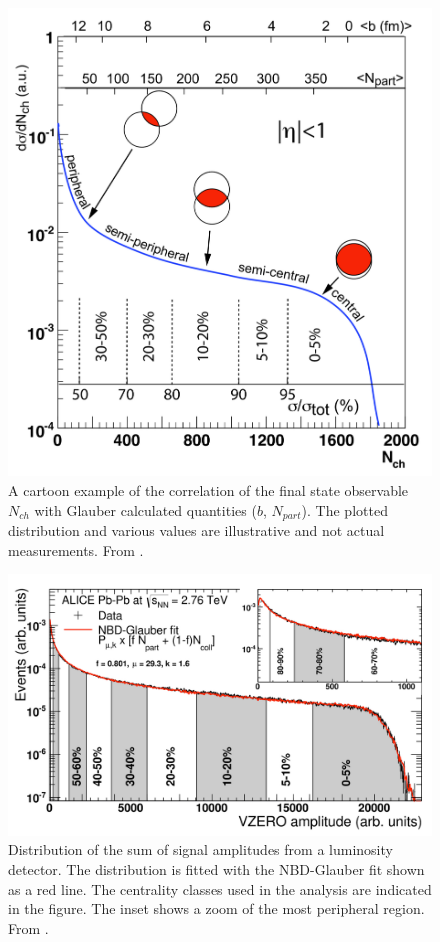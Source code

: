 \begin{figure}[!t]
\begin{center}
\includegraphics[width=0.75\linewidth]{Chapters/Analysis/Figs/glauber-centrality.pdf}
\caption{A cartoon example of the correlation of the final state observable $N_{ch}$ with Glauber calculated quantities ($b$, $N_{part}$). The plotted distribution and various values are illustrative and not actual measurements. From \cite{Miller:2007ri}.}
\label{fig:GlauberCent}
\end{center}
\end{figure}

\begin{figure}[!t]
\begin{center}
\includegraphics[width=0.85\linewidth]{Chapters/Analysis/Figs/glauber-vzero.pdf}
\caption{Distribution of the sum of signal amplitudes from a luminosity detector. The distribution is fitted with the NBD-Glauber fit shown as a red line. The centrality classes used in the analysis are indicated in the figure. The inset shows a zoom of the most peripheral region. From \cite{Abelev:2013qoq}.}
\label{fig:GlauberVZERO}
\end{center}
\end{figure}

